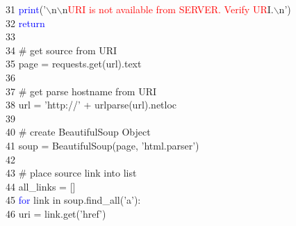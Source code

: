 31	 \hspace*{5mm}        \hspace*{10mm}\textcolor{blue}{print}('$\backslash$n$\backslash$n\textcolor{red}{URI is not available from SERVER. Verify UR}I.$\backslash$n')\\
32	 \hspace*{5mm}        \hspace*{10mm}\textcolor{blue}{return}\\
33	 \hspace*{5mm}\\
34	 \hspace*{5mm}    \hspace*{5mm}\# get source from URI\\
35	 \hspace*{5mm}    \hspace*{5mm}page = requests.get(url).text\\
36	 \hspace*{5mm}\\
37	 \hspace*{5mm}    \hspace*{5mm}\# get parse hostname from URI\\
38	 \hspace*{5mm}    \hspace*{5mm}url = 'http://' + urlparse(url).netloc\\
39	 \hspace*{5mm}\\
40	 \hspace*{5mm}    \hspace*{5mm}\# create BeautifulSoup Object\\
41	 \hspace*{5mm}    \hspace*{5mm}soup = BeautifulSoup(page, 'html.parser')\\
42	 \hspace*{5mm}\\
43	 \hspace*{5mm}    \hspace*{5mm}\# place source link into list\\
44	 \hspace*{5mm}    \hspace*{5mm}all\_links = []\\
45	 \hspace*{5mm}    \hspace*{5mm}\textcolor{blue}{for} link in soup.find\_all('a'):\\
46	 \hspace*{5mm}        \hspace*{10mm}uri = link.get('href')\\
